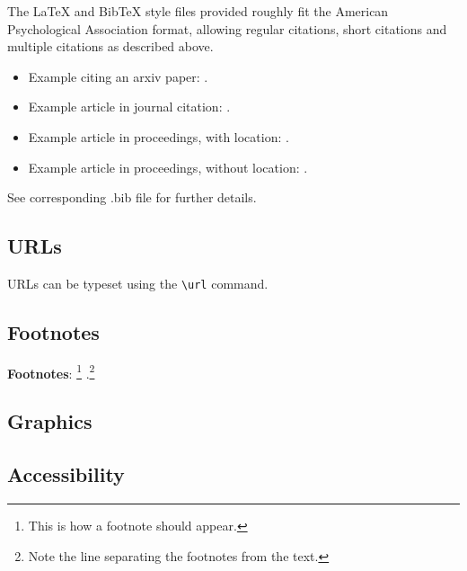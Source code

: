 \documentclass[11pt,a4paper]{article}
\begin{document}
The \LaTeX{} and Bib\TeX{} style files provided roughly fit the
American Psychological Association format, allowing regular citations, 
short citations and multiple citations as described above.  

\begin{itemize}
\item Example citing an arxiv paper: \cite{rasooli-tetrault-2015}. 
\item Example article in journal citation: \cite{Ando2005}.
\item Example article in proceedings, with location: \cite{borsch2011}.
\item Example article in proceedings, without location: \cite{andrew2007scalable}.
\end{itemize}
See corresponding .bib file for further details.


\subsection{URLs}

URLs can be typeset using the \verb|\url| command. 

\subsection{Footnotes}

{\bf Footnotes}: \footnote{This is how a footnote should appear.} .\footnote{Note the line
separating the footnotes from the text.}

\subsection{Graphics}



\subsection{Accessibility}
\label{ssec:accessibility}



\end{document}
